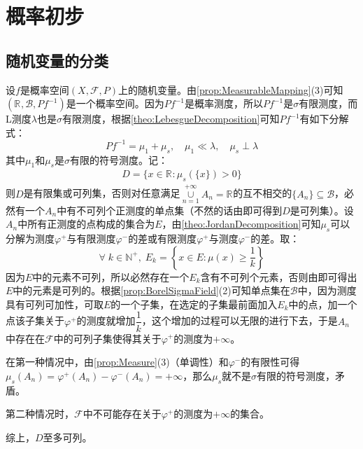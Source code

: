 \chapter{概率初步}

\section{随机变量的分类}
设$f$是概率空间$(X,\mathscr{F},P)$上的随机变量。由\cref{prop:MeasurableMapping}(3)可知$(\mathbb{R}^{},\mathcal{B},Pf^{-1})$是一个概率空间。因为$Pf^{-1}$是概率测度，所以$Pf^{-1}$是$\sigma$有限测度，而L测度$\lambda$也是$\sigma$有限测度，根据\cref{theo:LebesgueDecomposition}可知$Pf^{-1}$有如下分解式：
\begin{equation*}
	Pf^{-1}=\mu_1+\mu_s,\quad\mu_1\ll\lambda,\quad\mu_s\perp\lambda
\end{equation*}
其中$\mu_1$和$\mu_s$是$\sigma$有限的符号测度。记：
\begin{gather*}
	D=\{x\in\mathbb{R}^{}:\mu_s(\{x\})>0\}
\end{gather*}
则$D$是有限集或可列集，否则对任意满足$\underset{n=1}{\overset{+\infty}{\cup}}A_n=\mathbb{R}^{}$的互不相交的$\{A_n\}\subseteq\mathcal{B}$，必然有一个$A_n$中有不可列个正测度的单点集（不然的话由即可得到$D$是可列集）。设$A_n$中所有正测度的点构成的集合为$E$，由\cref{theo:JordanDecomposition}可知$\mu_s$可以分解为测度$\varphi^+$与有限测度$\varphi^-$的差或有限测度$\varphi^+$与测度$\varphi^-$的差。取：
\begin{equation*}
	\forall\;k\in\mathbb{N}^+,\;E_k=\left\{x\in E:\mu(x)\geqslant\frac{1}{k}\right\}
\end{equation*}
因为$E$中的元素不可列，所以必然存在一个$E_k$含有不可列个元素，否则由即可得出$E$中的元素是可列的。根据\cref{prop:BorelSigmaField}(2)可知单点集在$\mathcal{B}$中，因为测度具有可列可加性，可取$E$的一个子集，在选定的子集最前面加入$E_k$中的点，加一个点该子集关于$\varphi^+$的测度就增加$\dfrac{1}{k}$，这个增加的过程可以无限的进行下去，于是$A_n$中存在在$\mathscr{F}$中的可列子集使得其关于$\varphi^+$的测度为$+\infty$。\par
在第一种情况中，由\cref{prop:Measure}(3)（单调性）和$\varphi^-$的有限性可得$\mu_s(A_n)=\varphi^+(A_n)-\varphi^-(A_n)=+\infty$，那么$\mu_s$就不是$\sigma$有限的符号测度，矛盾。\par
第二种情况时，$\mathscr{F}$中不可能存在关于$\varphi^+$的测度为$+\infty$的集合。\par
综上，$D$至多可列。\par
